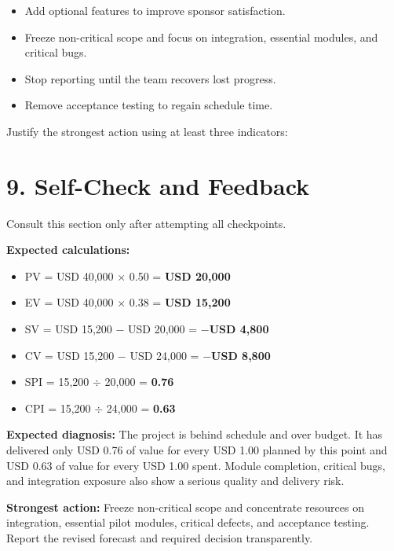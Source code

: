 \documentclass[11pt,a4paper]{article}
\begin{document}
\begin{itemize}
  \item[$\square$] Add optional features to improve sponsor satisfaction.
  \item[$\square$] Freeze non-critical scope and focus on integration, essential modules, and critical bugs.
  \item[$\square$] Stop reporting until the team recovers lost progress.
  \item[$\square$] Remove acceptance testing to regain schedule time.
\end{itemize}

Justify the strongest action using at least three indicators:

\vspace{10mm}\blankline

\section{9. Self-Check and Feedback}

Consult this section only after attempting all checkpoints.

\begin{checkbox}
\textbf{Expected calculations:}
\begin{itemize}
  \item PV = USD 40,000 $\times$ 0.50 = \textbf{USD 20,000}
  \item EV = USD 40,000 $\times$ 0.38 = \textbf{USD 15,200}
  \item SV = USD 15,200 $-$ USD 20,000 = \textbf{$-$USD 4,800}
  \item CV = USD 15,200 $-$ USD 24,000 = \textbf{$-$USD 8,800}
  \item SPI = 15,200 $\div$ 20,000 = \textbf{0.76}
  \item CPI = 15,200 $\div$ 24,000 = \textbf{0.63}
\end{itemize}
\end{checkbox}

\textbf{Expected diagnosis:} The project is behind schedule and over budget. It has delivered only USD 0.76 of value for every USD 1.00 planned by this point and USD 0.63 of value for every USD 1.00 spent. Module completion, critical bugs, and integration exposure also show a serious quality and delivery risk.

\textbf{Strongest action:} Freeze non-critical scope and concentrate resources on integration, essential pilot modules, critical defects, and acceptance testing. Report the revised forecast and required decision transparently.
\end{document}

